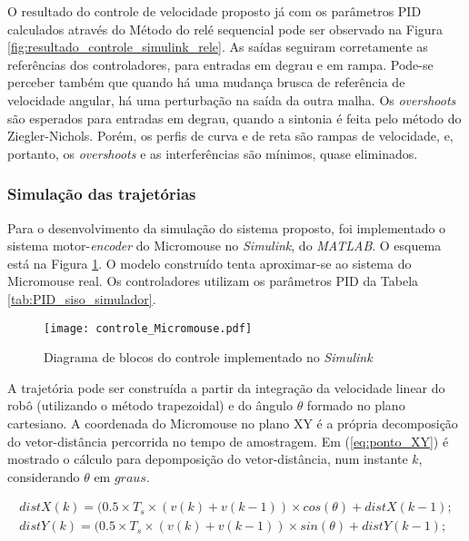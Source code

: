 O resultado do controle de velocidade proposto já com os parâmetros PID calculados através do Método do relé sequencial pode ser observado na Figura \ref{fig:resultado_controle_simulink_rele}. As saídas seguiram corretamente as referências dos controladores, para entradas em degrau e em rampa. Pode-se perceber também que quando há uma mudança brusca de referência de velocidade angular, há uma perturbação na saída da outra malha. Os \emph{overshoots} são esperados para entradas em degrau, quando a sintonia é feita pelo método do Ziegler-Nichols. Porém, os perfis de curva e de reta são rampas de velocidade, e, portanto, os \emph{overshoots} e as interferências são mínimos, quase eliminados.


\subsubsection{Simulação das trajetórias}
Para o desenvolvimento da simulação do sistema proposto, foi implementado o sistema motor-\textit{encoder} do Micromouse no \emph{Simulink}, do \textit{MATLAB}. O esquema está na Figura \ref{fig:controle_simulink}. O modelo construído tenta aproximar-se ao sistema do Micromouse real. Os controladores utilizam os parâmetros PID da Tabela \ref{tab:PID_siso_simulador}.

\begin{figure}[!htb]
	\caption{\label{fig:controle_simulink}Diagrama de blocos do controle implementado no \textit{Simulink}}
	\begin{center}
		\texttt{[image: controle\_Micromouse.pdf]}
	\end{center}
\end{figure}

A trajetória pode ser construída a partir da integração da velocidade linear do robô (utilizando o método trapezoidal) e do ângulo $\theta$ formado no plano cartesiano. A coordenada do Micromouse no plano XY é a própria decomposição do vetor-distância percorrida no tempo de amostragem. Em (\ref{eq:ponto_XY}) é mostrado o cálculo para depomposição do vetor-distância, num instante $k$, considerando $\theta$ em $graus$.

\begin{equation}
\label{eq:ponto_XY}
	\begin{split}
	distX(k) = (0.5 \times T_s \times (v(k) + v(k-1)) \times cos(\theta) + distX(k-1);\\
	distY(k) = (0.5 \times T_s \times (v(k) + v(k-1)) \times sin(\theta) + distY(k-1);\\
	\end{split}
\end{equation}


